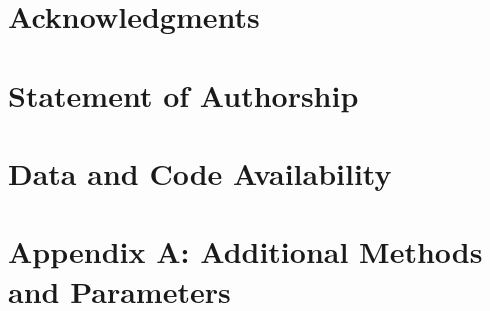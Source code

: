 \documentclass[11pt]{article}\usepackage[sc]{mathpazo} %
\begin{document}
    
  
    

\section*{Acknowledgments}



\section*{Statement of Authorship}


\section*{Data and Code Availability}


\section*{Appendix A: Additional Methods and Parameters}

%
%
%
%
\end{document}
